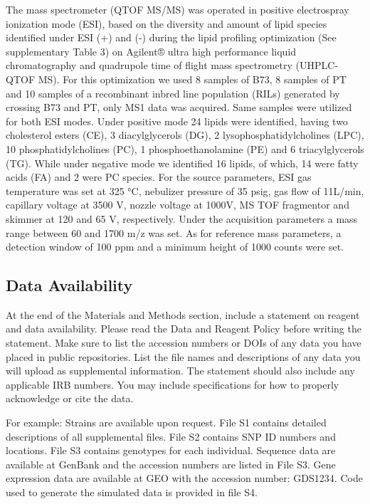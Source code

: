 \documentclass[9pt,twocolumn,twoside,lineno]{gsajnl}
\begin{document}
The mass spectrometer (QTOF MS/MS) was operated in positive electrospray ionization mode (ESI), based on the diversity and amount of lipid species identified under ESI (+) and (-) during the lipid profiling optimization (See supplementary Table 3) on Agilent® ultra high performance liquid chromatography and quadrupole time of flight mass spectrometry (UHPLC-QTOF MS). For this optimization we used 8 samples of B73, 8 samples of PT and 10 samples of a recombinant inbred line population (RILs) generated by crossing B73 and PT, only MS1 data was acquired. Same samples were utilized for both ESI modes. 
Under positive mode 24 lipids were identified, having two cholesterol esters (CE), 3 diacylglycerols (DG), 2 lysophosphatidylcholines (LPC), 10 phosphatidylcholines (PC), 1 phosphoethanolamine (PE) and 6 triacylglycerols (TG). 
While under negative mode we identified 16 lipids, of which, 14 were fatty acids (FA) and 2 were PC species. 
For the source parameters, ESI gas temperature was set at 325 °C, nebulizer pressure of 35 psig, gas flow of 11L/min, capillary voltage at 3500 V, nozzle voltage at 1000V, MS TOF fragmentor and skimmer at 120 and 65 V, respectively. 
Under the acquisition parameters a mass range between 60 and 1700 m/z was set. As for reference mass parameters, a detection window of 100 ppm and a minimum height of 1000 counts were set. 

\subsection{Data Availability}

At the end of the Materials and Methods section, include a statement on reagent and data availability. Please read the Data and Reagent Policy before writing the statement. Make sure to list the accession numbers or DOIs of any data you have placed in public repositories. List the file names and descriptions of any data you will upload as supplemental information. The statement should also include any applicable IRB numbers. You may include specifications for how to properly acknowledge or cite the data.

For example: Strains are available upon request. File S1 contains detailed descriptions of all supplemental files. File S2 contains SNP ID numbers and locations. File S3 contains genotypes for each individual. Sequence data are available at GenBank and the accession numbers are listed in File S3. Gene expression data are available at GEO with the accession number: GDS1234. Code used to generate the simulated data is provided in file S4. 
\end{document}
